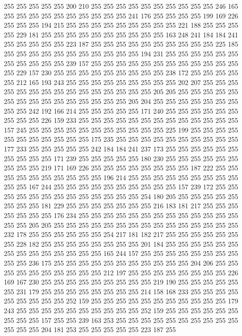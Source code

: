 255 255 255 255 255 200 210 255 255 255 255 255 255 255 255 255 255 246 165 255
255 255 255 255 255 255 255 255 255 241 176 255 255 255 255 199 169 226 255 255
255 194 215 255 255 255 255 255 255 255 255 255 221 188 255 255 255 255 229 181
255 255 255 255 255 255 255 255 255 255 163 248 241 184 184 241 255 255 255 255
255 223 187 255 255 255 255 255 255 255 255 255 255 225 185 255 255 255 255 255
255 255 255 255 255 255 194 231 255 255 255 255 255 255 255 255 255 255 255 239
157 255 255 255 255 255 255 255 255 255 255 255 255 255 229 157 230 255 255 255
255 255 255 255 255 255 238 172 255 255 255 255 255 212 165 193 243 255 255 255
255 255 255 255 255 255 202 207 255 255 255 255 255 255 255 255 255 255 255 255
255 255 255 205 205 255 255 255 255 255 255 255 255 255 255 255 255 255 255 255
205 204 255 255 255 255 255 255 255 255 255 242 192 166 214 255 255 255 255 255
171 240 255 255 255 255 255 255 255 255 255 226 159 233 255 255 255 255 255 255
255 255 255 255 255 255 255 157 245 255 255 255 255 255 255 255 255 255 255 255
225 199 255 255 255 255 255 255 255 255 255 255 255 175 235 255 255 255 255 255
255 255 255 255 255 177 233 255 255 255 255 255 242 184 184 241 237 173 255 255
255 255 255 255 255 255 255 255 171 239 255 255 255 255 255 180 230 255 255 255
255 255 255 255 255 255 219 171 169 226 255 255 255 255 255 255 255 255 187 222
255 255 255 255 255 255 255 255 255 255 196 214 255 255 255 255 255 255 255 255
255 255 255 167 244 255 255 255 255 255 255 255 255 255 255 157 239 172 255 255
255 255 255 255 255 255 255 255 255 255 255 254 180 205 255 255 255 255 255 255
255 255 181 229 255 255 255 255 255 255 255 216 183 181 217 255 255 255 255 255
255 255 176 234 255 255 255 255 255 255 255 255 255 255 255 255 255 255 255 205
205 255 255 255 255 255 255 255 255 255 255 255 255 255 255 255 232 178 255 255
255 255 255 255 254 217 181 182 217 255 255 255 255 255 255 255 228 182 255 255
255 255 255 255 255 255 201 184 255 255 255 255 255 255 255 255 255 255 255 255
255 255 165 244 157 255 255 255 255 255 255 255 255 255 255 236 175 255 255 255
255 255 255 255 255 255 255 255 204 206 255 255 255 255 255 255 255 255 255 255
212 197 255 255 255 255 255 255 255 255 226 169 167 230 255 255 255 255 255 255
255 255 255 219 190 255 255 255 255 255 255 231 179 255 255 255 255 255 255 255
255 214 158 168 233 255 255 255 255 255 255 255 255 255 252 159 255 255 255 255
255 255 255 255 255 255 255 179 243 255 255 255 255 255 255 255 255 255 255 252
159 255 255 255 255 255 255 255 255 255 157 255 255 239 163 253 255 255 255 255
255 255 255 255 255 255 255 255 255 204 181 253 255 255 255 255 255 223 187 255
